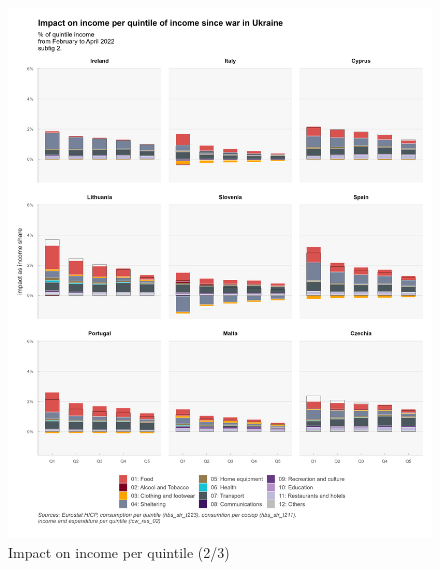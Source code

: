 \documentclass[
  9pt,
  a4paper,
  DIV=11,
  numbers=noendperiod,
  oneside]{scrartcl}
\begin{document}
\begin{figure}

\caption{Impact on income per quintile (2/3)}

{\centering \includegraphics[width=16cm,height=\textheight]{../svg/coicop_l1_wiu_2.png}

}

\end{figure}
\end{document}
